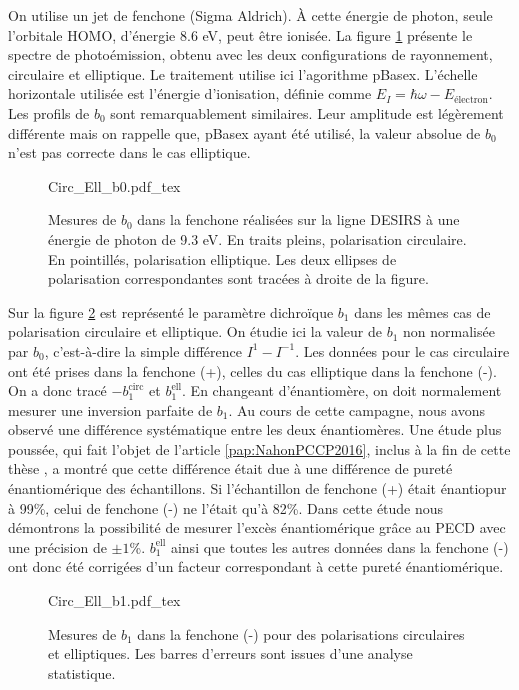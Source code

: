 On utilise un jet de fenchone (Sigma Aldrich). \`{A} cette énergie de photon, seule l'orbitale HOMO, d'énergie 8.6 eV, peut être ionisée. La figure \ref{fig:circ_ell_b0} présente le spectre de photoémission, obtenu avec les deux configurations de rayonnement, circulaire et elliptique. Le traitement utilise ici l'agorithme pBasex. L'échelle horizontale utilisée est l'énergie d'ionisation, définie comme $E_I = \hbar\omega - E_{\text{\'electron}}$. Les profils de $b_0$ sont remarquablement similaires. Leur amplitude est légèrement différente mais on rappelle que, pBasex ayant été utilisé, la valeur absolue de $b_0$ n'est pas correcte dans le cas elliptique.

\begin{figure}[!ht]
\centering
\def\svgwidth{0.8\columnwidth}
{Circ_Ell_b0.pdf_tex}
\caption{Mesures de $b_0$ dans la fenchone réalisées sur la ligne DESIRS à une énergie de photon de 9.3 eV. En traits pleins, polarisation circulaire. En pointillés, polarisation elliptique. Les deux ellipses de polarisation correspondantes sont tracées à droite de la figure.}
\label{fig:circ_ell_b0}
\end{figure}

Sur la figure \ref{fig:circ_ell_b1} est représenté le paramètre dichroïque $b_1$ dans les mêmes cas de polarisation circulaire et elliptique. On étudie ici la valeur de $b_1$ non normalisée par $b_0$, c'est-à-dire la simple différence $I^1-I^{-1}$. Les données pour le cas circulaire ont été prises dans la fenchone (+), celles du cas elliptique dans la fenchone (-). On a donc tracé $-b_1^{\text{circ}}$ et $b_1^{\text{ell}}$. En changeant d'énantiomère, on doit normalement mesurer une inversion parfaite de $b_1$. Au cours de cette campagne, nous avons observé une différence systématique entre les deux énantiomères. Une étude plus poussée, qui fait l'objet de l'article \ref{pap:NahonPCCP2016}, inclus à la fin de cette thèse , a montré que cette différence était due à une différence de pureté énantiomérique des échantillons. Si l'échantillon de fenchone (+) était énantiopur à 99\%, celui de fenchone (-) ne l'était qu'à 82\%. Dans cette étude nous démontrons la possibilité de mesurer l'excès énantiomérique grâce au PECD avec une précision de $\pm1$\%. $b_1^{\text{ell}}$ ainsi que toutes les autres données dans la fenchone (-) ont donc été corrigées d'un facteur correspondant à cette pureté énantiomérique.

\begin{figure}[!ht]
\centering
\def\svgwidth{0.8\columnwidth}
{Circ_Ell_b1.pdf_tex}
\caption{Mesures de $b_1$ dans la fenchone (-) pour des polarisations circulaires et elliptiques. Les barres d'erreurs sont issues d'une analyse statistique.}
\label{fig:circ_ell_b1}
\end{figure}

